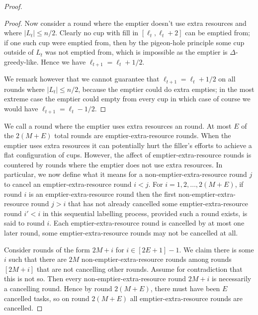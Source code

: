 \begin{proof}
\begin{proof}
    Now consider a round where the emptier doesn't use extra
    resources and where $|L_t| \le n/2$. 
    Clearly no cup with fill in $[\ell_t, \ell_t+2]$ can be
    emptied from; if one such cup were emptied from, then by the
    pigeon-hole principle some cup outside of $L_t$ was not
    emptied from, which is impossible as the emptier is
    $\Delta$-greedy-like. Hence we have $\ell_{t+1} =
    \ell_{t} + 1/2$.

    We remark however that we cannot guarantee that $\ell_{t+1} =
    \ell_t + 1/2$ on all rounds where $|L_t| \le n/2$, because the
    emptier could do extra empties; in the most extreme case the
    emptier could empty from every cup in which case of course we
    would have $\ell_{t+1} = \ell_t - 1/2$. 
  \end{proof}
  
  We call a round where the emptier uses extra resources an
   round. At most $E$ of the
  $2(M+E)$ total rounds are emptier-extra-resource rounds. When
  the emptier uses extra resources it can potentially hurt the
  filler's efforts to achieve a flat configuration of cups.
  However, the affect of emptier-extra-resource rounds is
  countered by rounds where the emptier does not use extra
  resources. In particular, we now define what it means for a
  non-emptier-extra-resource round $j$ to cancel an
  emptier-extra-resource round $i < j$. For $i = 1,2,\ldots,
  2(M+E)$, if round $i$ is an emptier-extra-resource round then
  the first non-emptier-extra-resource round $j > i$ that has not
  already cancelled some emptier-extra-resource round $i' < i$ in
  this sequential labelling process, provided such a round
  exists, is said to  round $i$. Each
  emptier-extra-resource round is cancelled by at most one later
  round, some emptier-extra-resource rounds may not be cancelled
  at all.

  Consider rounds of the form $2M + i$ for $i \in [2E+1]-1$. We
  claim there is some $i$ such that there are $2M$
  non-emptier-extra-resource rounds among rounds $[2M + i]$ that
  are not cancelling other rounds. Assume for contradiction that
  this is not so. Then every non-emptier-extra-resource round $2M + i$
  is necessarily a cancelling round. Hence by round $2(M + E)$,
  there must have been $E$ cancelled tasks, so on round $2(M+E)$
  all emptier-extra-resource rounds are cancelled.


\end{proof}
